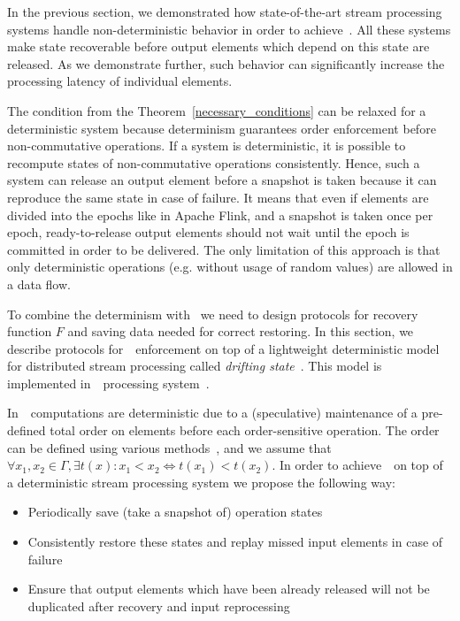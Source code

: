 
\label {fs-consistency-section}

In the previous section, we demonstrated how state-of-the-art stream processing systems handle non-deterministic behavior in order to achieve~\eo. All these systems make state recoverable before output elements which depend on this state are released. As we demonstrate further, such behavior can significantly increase the processing latency of individual elements.

The condition from the Theorem~\ref{necessary_conditions} can be relaxed for a deterministic system because determinism guarantees order enforcement before non-commutative operations. If a system is deterministic, it is possible to recompute states of non-commutative operations consistently. Hence, such a system can release an output element before a snapshot is taken because it can reproduce the same state in case of failure. It means that even if elements are divided into the epochs like in Apache Flink, and a snapshot is taken once per epoch, ready-to-release output elements should not wait until the epoch is committed in order to be delivered. The only limitation of this approach is that only deterministic operations (e.g. without usage of random values) are allowed in a data flow.

To combine the determinism with \eo\ we need to design protocols for recovery function $F$ and saving data needed for correct restoring. In this section, we describe protocols for~\eo\ enforcement on top of a lightweight deterministic model for distributed stream processing called {\em drifting state}~\cite{we2018adbis}. This model is implemented in~\FlameStream\ processing system~\cite{we2018beyondmr}.

In~\FlameStream\, computations are deterministic due to a (speculative) maintenance of a pre-defined total order on elements before each order-sensitive operation. The order can be defined using various methods~\cite{we2018seim}, and we assume that $\forall x_1,x_2\in \Gamma, \exists t(x): x_1 < x_2 \Longleftrightarrow t(x_1) < t(x_2)$. In order to achieve~\eo\ on top of a deterministic stream processing system we propose the following way:
\begin{itemize}
    \item Periodically save (take a snapshot of) operation states
    \item Consistently restore these states and replay missed input elements in case of failure
    \item Ensure that output elements which have been already released will not be duplicated after recovery and input reprocessing
\end{itemize}

